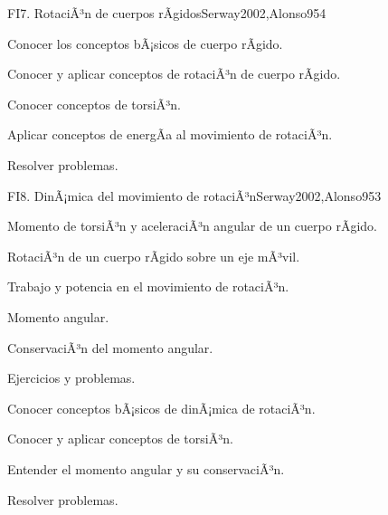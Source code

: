 \begin{syllabus}
\begin{unit}{FI7. RotaciÃ³n de cuerpos rÃ­gidos}{Serway2002,Alonso95}{4}
   \begin{unitgoals}
      \item Conocer los conceptos bÃ¡sicos de cuerpo rÃ­gido.
      \item Conocer y aplicar conceptos de rotaciÃ³n de cuerpo rÃ­gido.
      \item Conocer conceptos de torsiÃ³n.
      \item Aplicar conceptos de energÃ­a al movimiento de rotaciÃ³n.
      \item Resolver problemas.
   \end{unitgoals}
\end{unit}

\begin{unit}{FI8. DinÃ¡mica del movimiento de rotaciÃ³n}{Serway2002,Alonso95}{3}
\begin{topics}
      \item Momento de torsiÃ³n y aceleraciÃ³n angular de un cuerpo rÃ­gido.
      \item RotaciÃ³n de un cuerpo rÃ­gido sobre un eje mÃ³vil.
      \item Trabajo y potencia en el movimiento de rotaciÃ³n.
      \item Momento angular.
      \item ConservaciÃ³n del momento angular.
      \item Ejercicios y problemas.
    \end{topics}

   \begin{unitgoals}
      \item Conocer conceptos bÃ¡sicos de dinÃ¡mica de rotaciÃ³n.
      \item Conocer y aplicar conceptos de torsiÃ³n.
      \item Entender el momento angular y su conservaciÃ³n.
      \item Resolver problemas.
   \end{unitgoals}
\end{unit}

\begin{coursebibliography}
\end{coursebibliography}
\end{syllabus}
